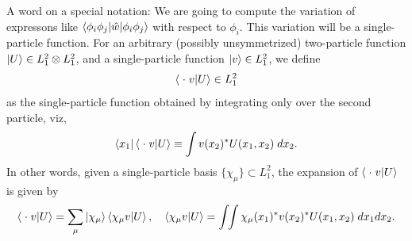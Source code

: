 \documentclass{report}
\theoremstyle{plain}
\theoremstyle{definition}
\begin{document}
A word on a
special notation: We are going to compute the variation of expressons
like $\braket{\phi_i\phi_j|\hat{w}|\phi_i\phi_j}$ with respect to
$\phi_i$. This variation will be a single-particle function. For an
arbitrary 
(possibly unsymmetrized) two-particle function $\ket{U} \in L_1^2\otimes
L_1^2$, and a single-particle function $\ket{v} \in L^2_1$, we define
\begin{equation}
  \braket{\;\cdot\; v|U} \in L^2_1
\end{equation}
as the single-particle function obtained by integrating only over the
second particle, viz,
\begin{equation}
  \bra{x_1}\braket{\;\cdot\; v|U} \equiv \int v(x_2)^* U(x_1,x_2)\; dx_2.
\end{equation}
In other words, given a single-particle basis $\{\chi_\mu\} \subset
L^2_1$, the expansion of $\braket{\;\cdot\; v|U}$ is given by
\begin{equation}
  \braket{\;\cdot\; v|U} = \sum_\mu \ket{\chi_\mu}\braket{\chi_\mu
    v|U}, \quad \braket{\chi_\mu
    v|U} = \int\!\!\int \chi_\mu(x_1)^* v(x_2)^* U(x_1,x_2) \; dx_1
  dx_2.
\end{equation}
\end{document}
